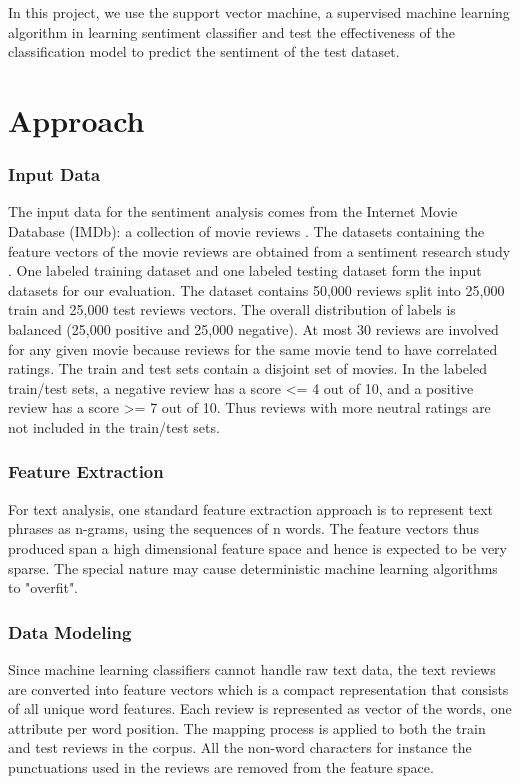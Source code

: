 \documentclass[conference]{IEEEtran}
\begin{document}
In this project, we use the support vector machine, a supervised machine learning algorithm in learning
sentiment classifier and test the effectiveness of the classification model to predict the sentiment of the test dataset.


\section{Approach}

\subsubsection{Input Data}

The input data for the sentiment analysis comes from the Internet Movie Database (IMDb): a collection of movie reviews \cite{IMDB}. The datasets containing the feature vectors of the movie reviews are obtained from a sentiment research study \cite{ARPDAC11}. One labeled training dataset and one labeled testing dataset form the input datasets for our evaluation. The dataset contains 50,000 reviews split into 25,000 train and 25,000 test reviews vectors. The overall distribution of labels is balanced (25,000 positive and 25,000 negative). At most 30 reviews are involved for any given movie because reviews for the same movie tend to have correlated ratings. The train and test sets contain a disjoint set of movies. In the labeled train/test sets, a negative review has a score <= 4 out of 10, and a positive review has a score >= 7 out of 10. Thus reviews with more neutral ratings are not included in the train/test sets.

\subsubsection{Feature Extraction}

For text analysis, one standard feature extraction approach is to represent text phrases as n-grams, using the sequences of n words. The feature vectors thus produced span a high dimensional feature space and hence is expected to be very sparse. The special nature may cause deterministic machine learning algorithms to "overfit".

\subsubsection{Data Modeling}

Since machine learning classifiers cannot handle raw text data, the text reviews are converted
into feature vectors which is a compact representation that consists of all unique word features. Each
review is represented as vector of the words, one attribute per word position. The mapping process is
applied to both the train and test reviews in the corpus. All the non-word characters for instance the
punctuations used in the reviews are removed from the feature space.
\end{document}
